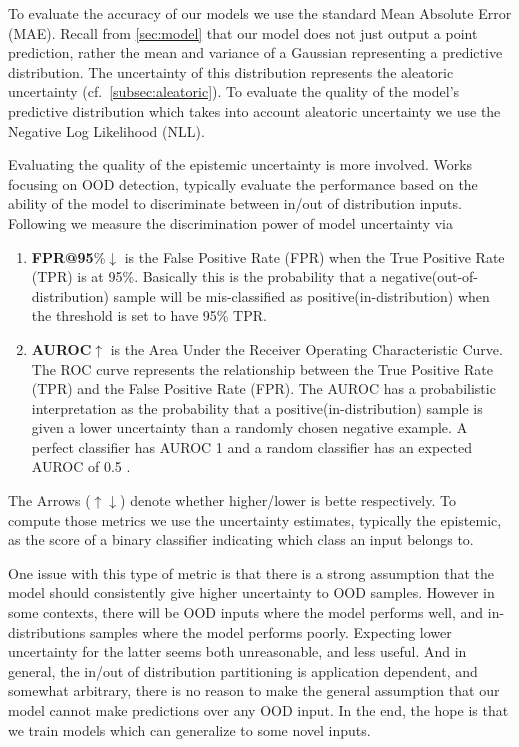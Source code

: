 \documentclass[../main.tex]{subfiles}
\begin{document}
To evaluate the accuracy of our models we use the standard Mean Absolute Error (MAE). Recall from \cref{sec:model} that our model does not just output a point prediction, rather the mean and variance of a Gaussian representing a predictive distribution. The uncertainty of this distribution represents the aleatoric uncertainty (cf.\ \ref{subsec:aleatoric}). 
To evaluate the quality of the model's predictive distribution which takes into account aleatoric uncertainty we use the Negative Log Likelihood (NLL). 


Evaluating the quality of the epistemic uncertainty is more involved. Works~\citep{liang2017enhancing, hein2019relu, lee2017training} focusing on OOD detection, typically evaluate the performance based on the ability of the model to discriminate between in/out of distribution inputs. Following \cite{liang2017enhancing} we measure the discrimination power of model uncertainty via 
\begin{enumerate}
    \item \textbf{FPR@95}\%$\downarrow$ is the False Positive Rate (FPR) when the True Positive Rate (TPR) is at 95\%. Basically this is the probability that a negative(out-of-distribution) sample will be mis-classified as positive(in-distribution) when the threshold is set to have 95\% TPR.   

    \item \textbf{AUROC}$\uparrow$ is the Area Under the Receiver Operating Characteristic Curve. The ROC curve represents the relationship between the True Positive Rate (TPR) and the False Positive Rate (FPR). The AUROC has a probabilistic interpretation as the probability that a positive(in-distribution) sample is given a lower uncertainty than a randomly chosen negative example. A perfect classifier has AUROC  1 and a random classifier has an expected AUROC of 0.5 . 
\end{enumerate}{}
The Arrows ($\uparrow \downarrow$) denote whether higher/lower is bette respectively. To compute those metrics we use the uncertainty estimates, typically the epistemic, as the score of a binary classifier indicating which class an input belongs to. 

One issue with this type of metric is that there is a strong assumption that the model should consistently give higher uncertainty to OOD samples. However in some contexts, there will be OOD inputs where the model performs well, and in-distributions samples where the model performs poorly. Expecting lower uncertainty for the latter seems both unreasonable, and less useful. And in general, the in/out of distribution partitioning is application dependent, and somewhat arbitrary, there is no reason to make the general assumption that our model cannot make predictions over any OOD input. In the end, the hope is that we train models which can generalize to some novel inputs. 
\end{document}
